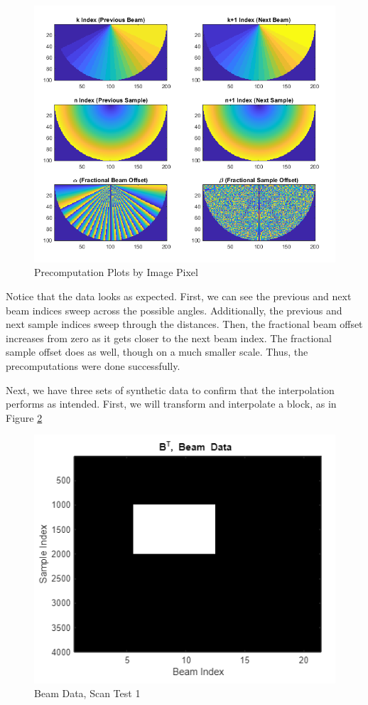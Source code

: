\begin{figure}[H]
    \centering
    \includegraphics[width=0.8\linewidth]{figures/scan_precompute.png}
    \caption{Precomputation Plots by Image Pixel}
    \label{fig:scan_precompute}
\end{figure}

Notice that the data looks as expected.  First, we can see the previous and next beam indices sweep across the possible angles.  Additionally, the previous and next sample indices sweep through the distances.  Then, the fractional beam offset increases from zero as it gets closer to the next beam index.  The fractional sample offset does as well, though on a much smaller scale.  Thus, the precomputations were done successfully.

Next, we have three sets of synthetic data to confirm that the interpolation performs as intended.  First, we will transform and interpolate a block, as in Figure \ref{fig:scan_block}

\begin{figure}[H]
    \centering
    \includegraphics[width=0.5\linewidth]{figures/scan_block.png}
    \caption{Beam Data, Scan Test 1}
    \label{fig:scan_block}
\end{figure}

